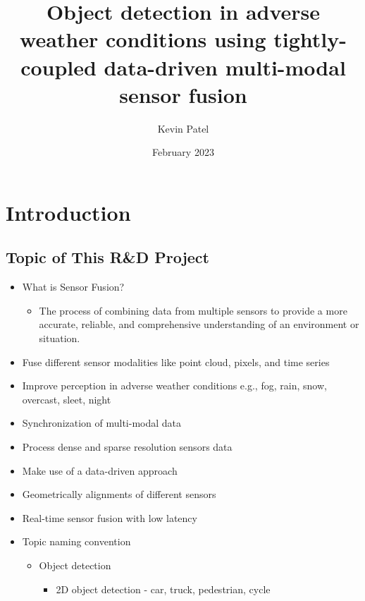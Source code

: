 \documentclass[rnd]{mas_proposal}
\title{Object detection in adverse weather conditions using tightly-coupled data-driven multi-modal sensor fusion}
\author{Kevin Patel}
\date{February 2023}
\begin{document}
\maketitle

\pagestyle{plain}

\section{Introduction}

\subsection{Topic of This R\&D Project}
\begin{itemize}
    \item What is Sensor Fusion?
    \begin{itemize}
        \item The process of combining data from multiple sensors to provide a more accurate, reliable, and comprehensive understanding of an environment or situation.
    \end{itemize}


    \item Fuse different sensor modalities like point cloud, pixels, and time series 
    \item Improve perception in adverse weather conditions e.g., fog, rain, snow, overcast, sleet, night
    \item Synchronization of multi-modal data
    \item Process dense and sparse resolution sensors data
    \item Make use of a data-driven approach
    \item Geometrically alignments of different sensors
    \item Real-time sensor fusion with low latency

    \item Topic naming convention
        \begin{itemize}
            \item {Object detection}
            \begin{itemize}
                \item 2D object detection - car, truck, pedestrian, cycle
            \end{itemize}
        

\end{itemize}
\end{itemize}
\end{document}

